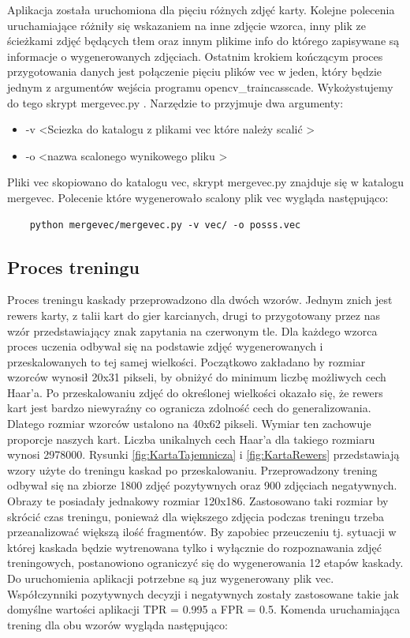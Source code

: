 Aplikacja została uruchomiona dla pięciu różnych zdjęć karty. Kolejne polecenia uruchamiające różniły się wskazaniem na inne zdjęcie wzorca, inny plik ze ścieżkami zdjęć będących tłem oraz innym plikime info do którego zapisywane są informacje o wygenerowanych zdjęciach.
Ostatnim krokiem kończącym proces przygotowania danych jest połączenie pięciu plików vec w jeden, który będzie jednym z argumentów wejścia programu opencv\_traincasscade. Wykożystujemy do tego skrypt mergevec.py \cite{mergeVec}. Narzędzie to przyjmuje dwa argumenty:
\begin{itemize}
    \item -v \textless Sciezka do katalogu z plikami vec które należy scalić \textgreater
    \item -o \textless nazwa scalonego wynikowego pliku \textgreater
\end{itemize}
Pliki vec skopiowano do katalogu vec, skrypt mergevec.py znajduje się w katalogu mergevec. Polecenie które wygenerowało scalony plik vec wygląda następująco: 
\begin{lstlisting}
    python mergevec/mergevec.py -v vec/ -o posss.vec
\end{lstlisting}
\subsection{Proces treningu}

Proces treningu kaskady przeprowadzono dla dwóch wzorów. Jednym znich jest rewers karty, z talii kart do gier karcianych, drugi to przygotowany przez nas wzór przedstawiający znak zapytania na czerwonym tle. Dla każdego wzorca proces uczenia odbywał się na podstawie zdjęć wygenerowanych i przeskalowanych to tej samej wielkości. Początkowo zakładano by rozmiar wzorców wynosił 20x31 pikseli, by obniżyć do minimum liczbę możliwych cech Haar'a.
Po przeskalowaniu zdjęć do określonej wielkości okazało się, że rewers kart jest bardzo niewyraźny co ogranicza zdolność cech do generalizowania. Dlatego rozmiar wzorców ustalono na 40x62 pikseli. Wymiar ten zachowuje proporcje naszych kart. Liczba unikalnych cech Haar'a dla takiego rozmiaru wynosi 2978000. Rysunki \ref{fig:KartaTajemnicza} i \ref{fig:KartaRewers} przedstawiają wzory użyte do treningu kaskad po przeskalowaniu. Przeprowadzony trening odbywał się na zbiorze 1800 zdjęć pozytywnych oraz 900 zdjęciach negatywnych. Obrazy te posiadały jednakowy rozmiar 120x186. Zastosowano taki rozmiar by skrócić czas treningu, ponieważ dla większego zdjęcia podczas treningu trzeba przeanalizować większą ilość fragmentów. By zapobiec przeuczeniu tj. sytuacji w której kaskada będzie wytrenowana tylko i wyłącznie do rozpoznawania zdjęć treningowych, postanowiono ograniczyć się do wygenerowania 12 etapów kaskady. Do uruchomienia aplikacji potrzebne są juz wygenerowany plik vec. Współczynniki pozytywnych decyzji i negatywnych zostały zastosowane takie jak domyślne wartości aplikacji TPR = 0.995 a FPR = 0.5. Komenda uruchamiająca trening dla obu wzorów wygląda następująco:

